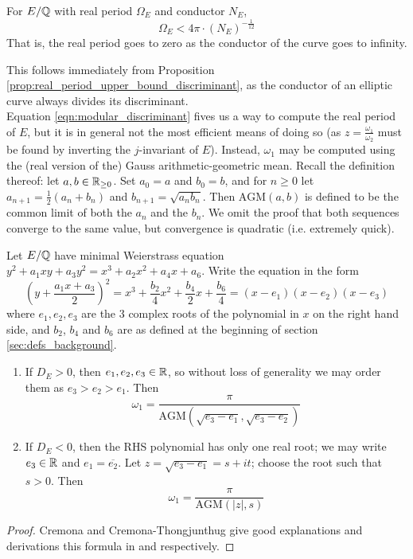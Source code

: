 \documentclass[10pt]{article}
\newcommand{\AGM}{\text{AGM}}
\newcommand{\conj}[1]{\overline{#1}}
\begin{document}
\begin{corollary}
For $E/\mathbb{Q}$ with real period $\Omega_E$ and conductor $N_E$,
\begin{equation}
\Omega_E < 4\pi \cdot (N_E)^{-\frac{1}{12}}
\end{equation}
That is, the real period goes to zero as the conductor of the curve goes to infinity.
\end{corollary}
This follows immediately from Proposition \ref{prop:real_period_upper_bound_discriminant}, as the conductor of an elliptic curve always divides its discriminant. \\


Equation \ref{eqn:modular_discriminant} fives us a way to compute the real period of $E$, but it is in general not the most efficient means of doing so (as $z = \frac{\omega_1}{\omega_2}$ must be found by inverting the $j$-invariant of $E$). Instead, $\omega_1$ may be computed using the (real version of the) Gauss arithmetic-geometric mean. Recall the definition thereof: let $a,b \in \mathbb{R}_{\ge0}$. Set $a_0 = a$ and $b_0 = b$, and for $n\ge 0$ let $a_{n+1} = \frac{1}{2}(a_{n}+b_{n})$ and $b_{n+1} = \sqrt{a_{n}b_{n}}$. Then $\AGM(a,b)$ is defined to be the common limit of both the $a_n$ and the $b_n$. We omit the proof that both sequences converge to the same value, but convergence is quadratic (i.e. extremely quick).

\begin{proposition}\label{prop:real_period_by_AGM}
Let $E/\mathbb{Q}$ have minimal Weierstrass equation $y^2 + a_1 xy + a_3 y^2 = x^3 + a_2 x^2 + a_4 x + a_6$. Write the equation in the form
\begin{equation}\label{eqn:weierstrass_with_bn}
\left(y + \frac{a_1x + a_3}{2}\right)^2 = x^3 + \frac{b_2}{4} x^2 + \frac{b_4}{2} x + \frac{b_6}{4} = (x-e_1)(x-e_2)(x-e_3)
\end{equation}
where $e_1,e_2,e_3$ are the 3 complex roots of the polynomial in $x$ on the right hand side, and $b_2$, $b_4$ and $b_6$ are as defined at the beginning of section \ref{sec:defs_background}.
\begin{enumerate}
\item If $D_E > 0$, then $e_1,e_2,e_3 \in \mathbb{R}$, so without loss of generality we may order them as $e_3 > e_2 > e_1$. Then
\begin{equation}\label{eqn:omega_D_pos}
\omega_1 = \frac{\pi}{\AGM(\sqrt{e_3-e_1},\sqrt{e_3-e_2})}
\end{equation}
\item If $D_E < 0$, then the RHS polynomial has only one real root; we may write $e_3 \in \mathbb{R}$ and $e_1 = \conj{e_2}$. Let $z = \sqrt{e_3-e_1} = s + it$; choose the root such that $s>0$. Then
\begin{equation}\label{eqn:omega_D_neg}
\omega_1 = \frac{\pi}{\AGM(|z|,s)}
\end{equation}
\end{enumerate}
\end{proposition}
\begin{proof}
Cremona and Cremona-Thongjunthug give good explanations and derivations this formula in \cite{Cre-1997} and \cite{Cre-2013} respectively.
\end{proof}
\end{document}
